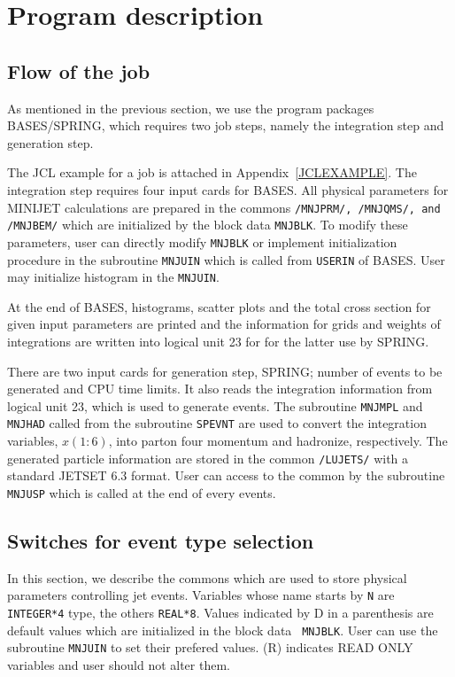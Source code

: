 %
%

\section{Program description}
\subsection{Flow of the job}
As mentioned in the previous section,
we use the program packages BASES/SPRING\cite{BASES86,GRACE92},
which requires two job steps, namely the integration step 
and generation step.  

The JCL example for a job is attached in Appendix~\ref{JCLEXAMPLE}.
The integration step requires four input cards for BASES.
All physical parameters for MINIJET calculations are
prepared in the commons {\tt /MNJPRM/, /MNJQMS/, {\rm and } /MNJBEM/}
which are initialized by the block data {\tt MNJBLK}.
To modify these parameters, user can directly modify 
{\tt MNJBLK} or implement initialization procedure 
in the subroutine {\tt MNJUIN} which is called from 
{\tt USERIN} of BASES. User may initialize 
histogram in the {\tt MNJUIN}.

At the end of BASES, histograms, scatter plots and the total cross
section for given input parameters are printed and the information
for grids and weights of integrations are written into logical 
unit 23 for for the latter use by SPRING.

There are two input cards for generation step, SPRING; number of
events to be generated and CPU time limits.  
It also reads the integration information
from logical unit 23,
which is used to generate events.
The subroutine {\tt MNJMPL} and {\tt MNJHAD}
called from the subroutine {\tt SPEVNT}
are used to convert the integration variables, $x(1:6)$,
into parton four momentum and hadronize, respectively.  
The generated particle information are
stored in the common {\tt /LUJETS/}
with a standard JETSET 6.3 format.  User can access to the common
by the subroutine {\tt MNJUSP} which is called at the end of
every events.



%
\subsection{Switches for event type selection}
In this section, we describe the commons which are used to store
physical parameters controlling jet events.
Variables whose name starts by {\tt N} are {\tt INTEGER*4} type, the
others {\tt REAL*8}. Values indicated by D in a parenthesis
are default values which are initialized in the block data {\tt
MNJBLK}.  User can use the subroutine {\tt MNJUIN} to 
set their prefered values.
(R) indicates READ ONLY variables and user should not alter them. 

